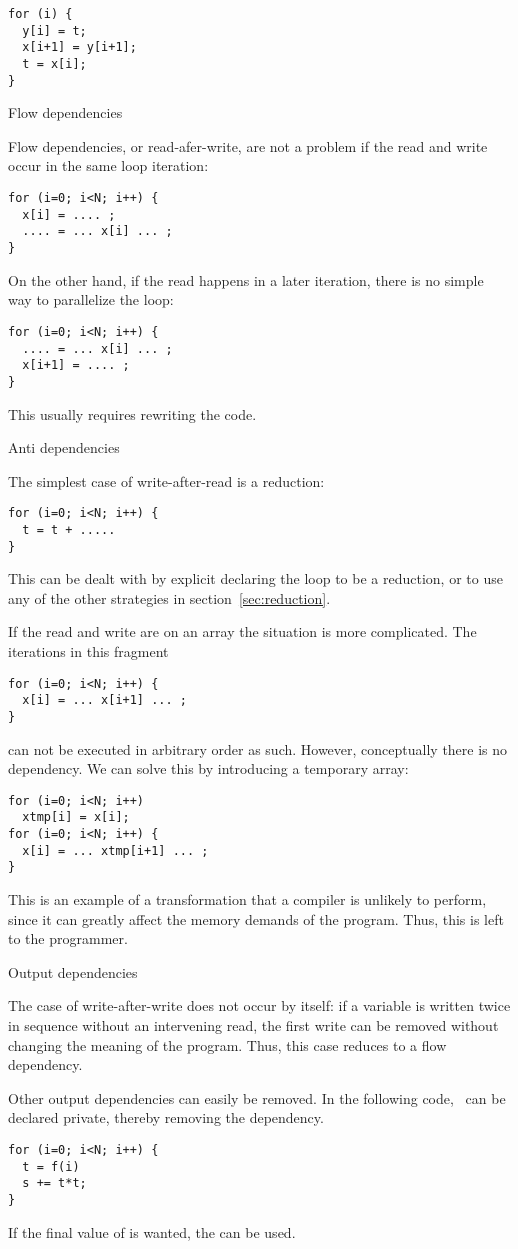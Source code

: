 \begin{verbatim}
for (i) {
  y[i] = t;
  x[i+1] = y[i+1];
  t = x[i];
}
\end{verbatim}

 {Flow dependencies}

Flow dependencies, or read-afer-write,
are not a problem if the read and write occur in the same
loop iteration:
\begin{verbatim}
for (i=0; i<N; i++) {
  x[i] = .... ;
  .... = ... x[i] ... ;
}
\end{verbatim}
On the other hand, if the read happens in a later iteration,
there is no simple way to parallelize the loop:
\begin{verbatim}
for (i=0; i<N; i++) {
  .... = ... x[i] ... ;
  x[i+1] = .... ;
}
\end{verbatim}
This usually requires rewriting the code.

 {Anti dependencies}

The simplest case of write-after-read is a reduction:
\begin{verbatim}
for (i=0; i<N; i++) {
  t = t + .....
}
\end{verbatim}
This can be dealt with by explicit declaring the loop to be a reduction,
or to use any of the other strategies in section~\ref{sec:reduction}.

If the read and write are on an array the situation is more complicated.
The iterations in this fragment
\begin{verbatim}
for (i=0; i<N; i++) {
  x[i] = ... x[i+1] ... ;
}
\end{verbatim}
can not be executed in arbitrary order as such. However, conceptually there
is no dependency. We can solve this by introducing a temporary array:
\begin{verbatim}
for (i=0; i<N; i++)
  xtmp[i] = x[i];
for (i=0; i<N; i++) {
  x[i] = ... xtmp[i+1] ... ;
}
\end{verbatim}
This is an example of a transformation that a compiler is unlikely
to perform, since it can greatly affect the memory demands of the program.
Thus, this is left to the programmer.

 {Output dependencies}

The case of write-after-write does not occur by itself:
if a variable is written twice in sequence without an intervening
read, the first write can be removed without changing the meaning of the program.
Thus, this case reduces to a flow dependency.

Other output dependencies can easily be removed. In the following code, ~can be
declared private, thereby removing the dependency.
\begin{verbatim}
for (i=0; i<N; i++) {
  t = f(i)
  s += t*t;
}
\end{verbatim}
If the final value of  is wanted, the  can be used.

